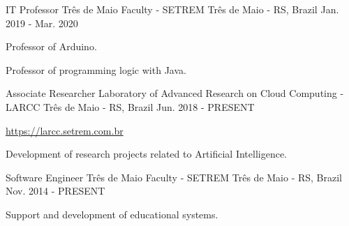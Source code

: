 
\begin{cventries}
	\cventry
	{IT Professor} %
	{Três de Maio Faculty - SETREM} %
	{Três de Maio - RS, Brazil} %
	{Jan. 2019 - Mar. 2020} %
	{
		\begin{cvitems} %
			\item {Professor of Arduino.}
			\item {Professor of programming logic with Java.}
		\end{cvitems}
	}

	\cventry
	{Associate Researcher} %
	{Laboratory of Advanced Research on Cloud Computing - LARCC} %
	{Três de Maio - RS, Brazil} %
	{Jun. 2018 - PRESENT} %
	{
		\begin{cvitems} %
			\item {\href{https://larcc.setrem.com.br}{https://larcc.setrem.com.br}}
			\item {Development of research projects related to Artificial Intelligence.}
		\end{cvitems}
	}

	\cventry
	{Software Engineer} %
	{Três de Maio Faculty - SETREM} %
	{Três de Maio - RS, Brazil} %
	{Nov. 2014 - PRESENT} %
	{
		\begin{cvitems} %
			\item {Support and development of educational systems.}
		\end{cvitems}
	}

\end{cventries}

